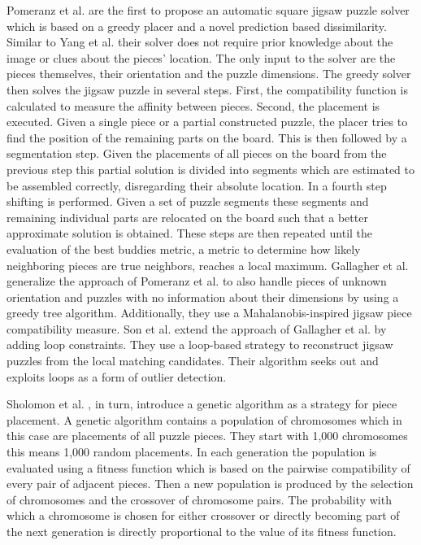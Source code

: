 \documentclass[11pt]{report}
\begin{document}
Pomeranz et al. \cite{Pomeranz2011} are the first to propose an automatic square
jigsaw puzzle solver which is based on a greedy placer and a novel prediction
based dissimilarity. Similar to Yang et al. \cite{yang2011particle} their solver
does not require prior knowledge about the image or clues about the pieces'
location. The only input to the solver are the pieces themselves, their
orientation and the puzzle dimensions. The greedy solver then solves the jigsaw
puzzle in several steps. First, the compatibility function is calculated to
measure the affinity between pieces. Second, the placement is executed. Given a
single piece or a partial constructed puzzle, the placer tries to find the
position of the remaining parts on the board. This is then followed by a
segmentation step. Given the placements of all pieces on the board from the
previous step this partial solution is divided into segments which are estimated
to be assembled correctly, disregarding their absolute location. In a fourth step
shifting is performed. Given a set of puzzle segments these segments and
remaining individual parts are relocated on the board such that a better
approximate solution is obtained. These steps are then repeated until the
evaluation of the best buddies metric, a metric to determine how likely
neighboring pieces are true neighbors, reaches a local maximum. Gallagher et al.
\cite{gallagher2012jigsaw} generalize the approach of Pomeranz et al.
\cite{Pomeranz2011} to also handle pieces of unknown orientation and puzzles
with no information about their dimensions by using a greedy tree algorithm.
Additionally, they use a Mahalanobis-inspired jigsaw piece compatibility measure.
Son et al. \cite{son2014solving} extend the approach of Gallagher et al.
\cite{gallagher2012jigsaw} by adding loop constraints. They use a loop-based
strategy to reconstruct jigsaw puzzles from the local matching candidates. Their
algorithm seeks out and exploits loops as a form of outlier detection.

Sholomon et al. \cite{sholomon2013genetic}, in turn, introduce a genetic
algorithm as a strategy for piece placement. A genetic algorithm contains a
population of chromosomes which in this case are placements of all puzzle
pieces. They start with 1,000 chromosomes this means 1,000 random placements. In
each generation the population is evaluated using a fitness function which is
based on the pairwise compatibility of every pair of adjacent pieces. Then a new
population is produced by the selection of chromosomes and the crossover of
chromosome pairs. The probability with which a chromosome is chosen for either
crossover or directly becoming part of the next generation is directly
proportional to the value of its fitness function.
\end{document}
